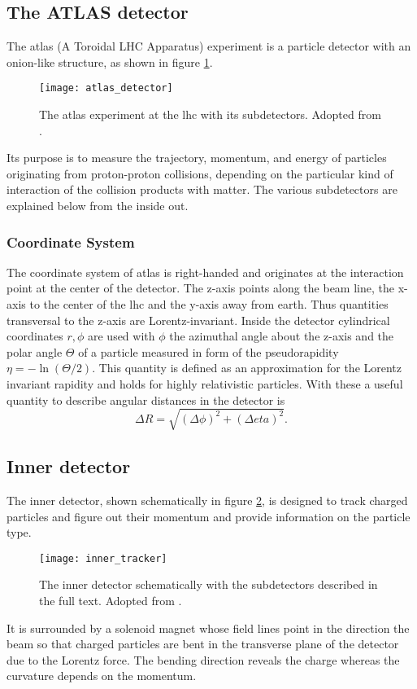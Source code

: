 \subsection{The ATLAS detector}
The \ac{atlas} (A Toroidal LHC Apparatus) experiment is a particle detector with an onion-like structure, as shown in figure \ref{fig:atlas_detector}.
\begin{figure}
    \centering
    \texttt{[image: atlas\_detector]}
        \caption[]{The \ac{atlas} experiment at the \ac{lhc} with its subdetectors. Adopted from \citep{Pequenao:1095924}.}
    \label{fig:atlas_detector}    
\end{figure}
Its purpose is to measure the trajectory, momentum, and energy of particles originating from proton-proton collisions, depending on the particular kind of interaction of the collision products with matter. The various subdetectors are explained below from the inside out.

\subsubsection*{Coordinate System}
The coordinate system of \ac{atlas} is right-handed and originates at the interaction point at the center of the detector. The z-axis points along the beam line, the x-axis to the center of the lhc and the y-axis away from earth. Thus quantities transversal to the z-axis are Lorentz-invariant. Inside the detector cylindrical coordinates $r,\phi$ are used with $\phi$ the azimuthal angle about the z-axis and the polar angle $\Theta$ of a particle measured in form of the pseudorapidity $\eta=-\ln(\Theta/2)$. This quantity is defined as an approximation for the Lorentz invariant rapidity and holds for highly relativistic particles. With these a useful quantity to describe angular distances in the detector is
\begin{equation}
    \Delta R = \sqrt{(\Delta\phi)^2+(\Delta eta)^2}.
\end{equation}

\subsection{Inner detector}
The inner detector, shown schematically in figure \ref{fig:inner_tracker}, is designed to track charged particles and figure out their momentum and provide information on the particle type. 
\begin{figure}
    \centering
    \texttt{[image: inner\_tracker]}
        \caption[]{The inner detector schematically with the subdetectors described in the full text. Adopted from \citep{Potamianos:2016ptf}.}
    \label{fig:inner_tracker}    
\end{figure}
It is surrounded by a solenoid magnet whose field lines point in the direction the beam so that charged particles are bent in the transverse plane of the detector due to the Lorentz force. The bending direction reveals the charge whereas the curvature depends on the momentum.

